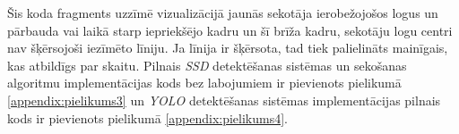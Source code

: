 Šis koda fragments uzzīmē vizualizācijā jaunās sekotāja ierobežojošos logus un pārbauda vai laikā starp iepriekšējo kadru un šī brīža kadru, sekotāju logu centri nav šķērsojoši iezīmēto līniju. Ja līnija ir šķērsota, tad tiek palielināts mainīgais, kas atbildīgs par skaitu. Pilnais \textit{SSD} detektēšanas sistēmas un sekošanas algoritmu implementācijas kods bez labojumiem ir pievienots pielikumā \ref{appendix:pielikums3} un \textit{YOLO} detektēšanas sistēmas implementācijas pilnais kods ir pievienots pielikumā \ref{appendix:pielikums4}.